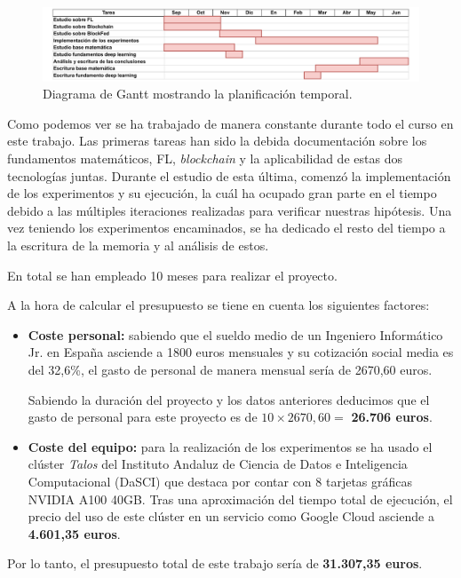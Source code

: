 \begin{figure}[!h]
    \centering
    \includegraphics[width=\textwidth]{figuras/gantt.pdf}
    \caption{Diagrama de Gantt mostrando la planificación temporal.}
    \label{fig:gantt}
\end{figure}
Como podemos ver se ha trabajado de manera constante durante todo el curso en este trabajo. Las primeras tareas han sido la debida documentación sobre los fundamentos matemáticos, \ac{FL}, \textit{blockchain} y la aplicabilidad de estas dos tecnologías juntas. Durante el estudio de esta última, comenzó la implementación de los experimentos y su ejecución, la cuál ha ocupado gran parte en el tiempo debido a las múltiples iteraciones realizadas para verificar nuestras hipótesis. Una vez teniendo los experimentos encaminados, se ha dedicado el resto del tiempo a la escritura de la memoria y al análisis de estos.


En total se han empleado 10 meses para realizar el proyecto.


A la hora de calcular el presupuesto se tiene en cuenta los siguientes factores:
\begin{itemize}
    \item \textbf{Coste personal:} sabiendo que el sueldo medio de un Ingeniero Informático Jr. en España asciende a 1800 euros mensuales y su cotización social media es del 32,6\%, el gasto de personal de manera mensual sería de 2670,60 euros.

    Sabiendo la duración del proyecto y los datos anteriores deducimos que el gasto de personal para este proyecto es de $10 \times 2670,60=$ \textbf{26.706 euros}.

    \item \textbf{Coste del equipo:} para la realización de los experimentos se ha usado el clúster \textit{Talos} del Instituto Andaluz de Ciencia de Datos e Inteligencia Computacional (DaSCI) que destaca por contar con 8 tarjetas gráficas NVIDIA A100 40GB. Tras una aproximación del tiempo total de ejecución, el precio del uso de este clúster en un servicio como Google Cloud asciende a \textbf{4.601,35 euros}.
\end{itemize}

Por lo tanto, el presupuesto total de este trabajo sería de \textbf{31.307,35 euros}.